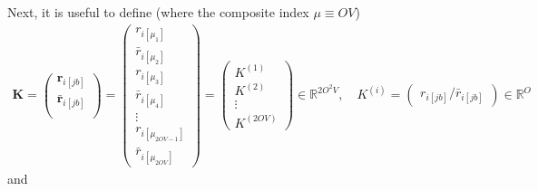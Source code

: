 Next, it is useful to define (where the composite index $\mu \equiv OV$)
\begin{align}
    \bm{K} = \begin{pmatrix}
\bm{r}_{i[jb]} \\
\bm{\bar{r}}_{i[{jb}]} \\
\end{pmatrix} = \begin{pmatrix}
r_{i[\mu_1]} \\[6pt]
\bar{r}_{i[\mu_2]} \\[6pt]
r_{i[\mu_3]} \\[6pt]
\bar{r}_{i[\mu_4]} \\[6pt]
\vdots \\[6pt]
r_{i[\mu_{2OV-1}]} \\[6pt]
\bar{r}_{i[\mu_{2OV}]}
\end{pmatrix} = \begin{pmatrix}
K^{(1)} \\[6pt]
K^{(2)} \\[6pt]
\vdots \\[6pt]
K^{(2OV)}
\end{pmatrix} \in \mathbb{R}^{2O^2V},
\quad
K^{(i)} = \begin{pmatrix}
r_{i[jb]}/\bar{r}_{i[{j} b]}
\end{pmatrix} \in \mathbb{R}^{O}
\end{align} 
and
